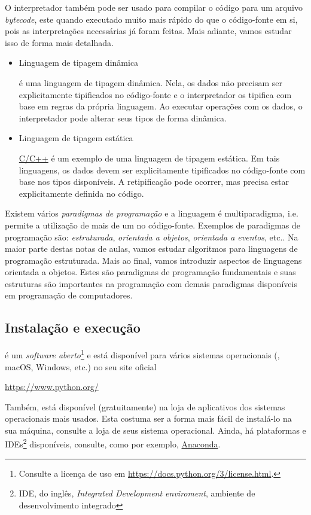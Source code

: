 O interpretador {\python} também pode ser usado para compilar o código para um arquivo \emph{bytecode}, este quando executado muito mais rápido do que o código-fonte em si, pois as interpretações necessárias já foram feitas. Mais adiante, vamos estudar isso de forma mais detalhada.

\begin{itemize}
\item Linguagem de tipagem dinâmica

  {\python} é uma linguagem de tipagem dinâmica. Nela, os dados não precisam ser explicitamente tipificados no código-fonte e o interpretador os tipifica com base em regras da própria linguagem. Ao executar operações com os dados, o interpretador pode alterar seus tipos de forma dinâmica.

\item Linguagem de tipagem estática

  \href{https://pt.wikipedia.org/wiki/C\%2B\%2B}{C/C++} é um exemplo de uma linguagem de tipagem estática. Em tais linguagens, os dados devem ser explicitamente tipificados no código-fonte com base nos tipos disponíveis. A retipificação pode ocorrer, mas precisa estar explicitamente definida no código.
\end{itemize}

Existem vários \emph{paradigmas de programação} e a linguagem {\python} é multiparadigma, i.e. permite a utilização de mais de um no código-fonte. Exemplos de paradigmas de programação são: \emph{estruturada}, \emph{orientada a objetos}, \emph{orientada a eventos}, etc.. Na maior parte destas notas de aulas, vamos estudar algoritmos para linguagens de programação estruturada. Mais ao final, vamos introduzir aspectos de linguagens orientada a objetos. Estes são paradigmas de programação fundamentais e suas estruturas são importantes na programação com demais paradigmas disponíveis em programação de computadores.

\subsection{Instalação e execução}

{\python} é um \emph{software aberto}\footnote{Consulte a licença de uso em \url{https://docs.python.org/3/license.html}.} e está disponível para vários sistemas operacionais ({\linux}, macOS, Windows, etc.) no seu site oficial
\begin{center}
  \url{https://www.python.org/}
\end{center}
Também, está disponível (gratuitamente) na loja de aplicativos dos sistemas operacionais mais usados. Esta costuma ser a forma mais fácil de instalá-lo na sua máquina, consulte a loja de seus sistema operacional. Ainda, há plataformas e IDEs\footnote{IDE, do inglês, {\it Integrated Development enviroment}, ambiente de desenvolvimento integrado} {\python} disponíveis, consulte, como por exemplo, \href{https://www.anaconda.com/}{Anaconda}.

